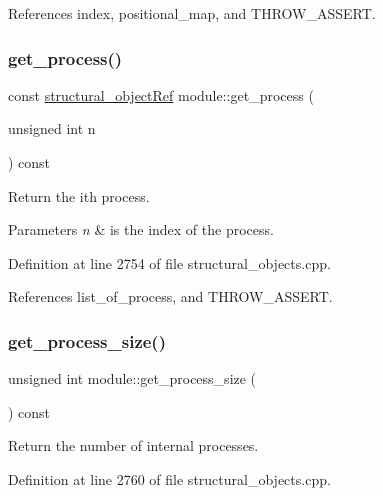 References index, positional\+\_\+map, and T\+H\+R\+O\+W\+\_\+\+A\+S\+S\+E\+RT.

\mbox{\label{classmodule_a37459d0c75ef740bb39f8eadc01e107f}} 
\subsubsection{\texorpdfstring{get\+\_\+process()}{get\_process()}}
{\footnotesize\ttfamily const \hyperlink{structural__objects_8hpp_a8ea5f8cc50ab8f4c31e2751074ff60b2}{structural\+\_\+object\+Ref} module\+::get\+\_\+process (\begin{DoxyParamCaption}\item[{unsigned int}]{n }\end{DoxyParamCaption}) const}



Return the ith process. 


\begin{DoxyParams}{Parameters}
{\em n} & is the index of the process. \\
\hline
\end{DoxyParams}


Definition at line 2754 of file structural\+\_\+objects.\+cpp.



References list\+\_\+of\+\_\+process, and T\+H\+R\+O\+W\+\_\+\+A\+S\+S\+E\+RT.

\mbox{\label{classmodule_a61d5c6c3c2de87f2fcdb3d8ac9cc5bcf}} 
\subsubsection{\texorpdfstring{get\+\_\+process\+\_\+size()}{get\_process\_size()}}
{\footnotesize\ttfamily unsigned int module\+::get\+\_\+process\+\_\+size (\begin{DoxyParamCaption}{ }\end{DoxyParamCaption}) const}



Return the number of internal processes. 



Definition at line 2760 of file structural\+\_\+objects.\+cpp.



